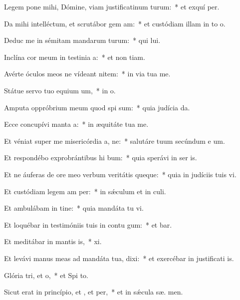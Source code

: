 \item Legem pone mihi, Dómine, viam justificatinum turum:~* et exquí  per.
\item Da mihi intelléctum, et scrutábor gem am:~* et custódiam illam in to  o.
\item Deduc me in sémitam mandarum turum:~* qui  lui.
\item Inclína cor meum in testinia a:~* et non  tiam.
\item Avérte óculos meos ne vídeant nitem:~* in via tua  me.
\item Státue servo tuo equium um,~* in  o.
\item Amputa oppróbrium meum quod spi sum:~* quia judícia  da.
\item Ecce concupívi manta a:~* in æquitáte tua  me.
\item Et véniat super me misericórdia a, ne:~* salutáre tuum secúndum e um.
\item Et respondébo exprobrántibus hi bum:~* quia sperávi in ser is.
\item Et ne áuferas de ore meo verbum veritátis queque:~* quia in judíciis tuis vi.
\item Et custódiam legem am per:~* in sǽculum et in  culi.
\item Et ambulábam in tine:~* quia mandáta tu vi.
\item Et loquébar in testimóniis tuis in contu gum:~* et  bar.
\item Et meditábar in mantis is,~*  xi.
\item Et levávi manus meas ad mandáta tua,  dixi:~* et exercébar in justificati is.
\item Glória tri, et o,~* et Spi to.
\item Sicut erat in princípio, et , et per,~* et in sǽcula sæ. men.
